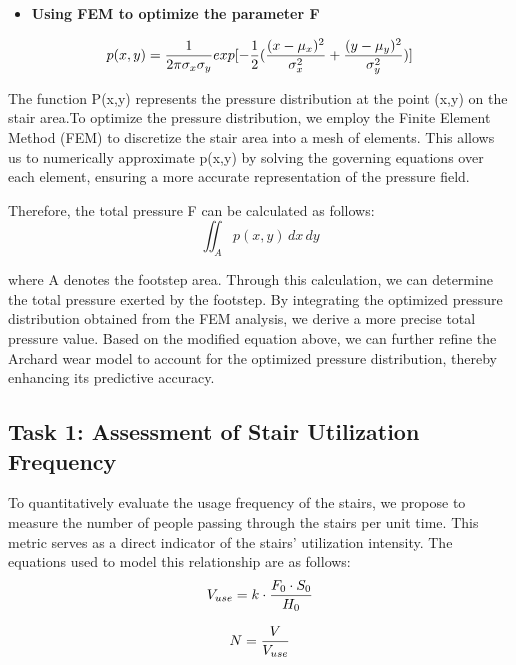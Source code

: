 \documentclass{mcmthesis}
\begin{document}
\begin{itemize}
\item {\bf Using FEM to optimize the parameter F}
\end{itemize}

\begin{equation} 
\label{eq:4}
\hfill p(x,y) = \frac{1}{2\pi\sigma_x\sigma_y} exp[-\frac{1}{2}(\frac{(x-\mu_x)^2}{\sigma_x^2} + \frac{(y-\mu_y)^2}{\sigma_y^2})]
\end{equation}

\noindent \hspace{1.5em}The function P(x,y) represents the pressure distribution at the point (x,y) on the stair area.To optimize the pressure distribution, we employ the Finite Element Method (FEM) to discretize the stair area into a mesh of elements. This allows us to numerically approximate p(x,y) by solving the governing equations over each element, ensuring a more accurate representation of the pressure field.

Therefore, the total pressure F can be calculated as follows:
\begin{equation}
\label{eq5}
\iint_A p(x, y) \, dx \, dy
\end{equation}
    
where A denotes the footstep area. Through this calculation, we can determine the total pressure exerted by the footstep. By integrating the optimized pressure distribution obtained from the FEM analysis, we derive a more precise total pressure value. Based on the modified equation above, we can further refine the Archard wear model to account for the optimized pressure distribution, thereby enhancing its predictive accuracy.

\subsection{Task 1: Assessment of Stair Utilization Frequency}

\hspace{1.5em}To quantitatively evaluate the usage frequency of the stairs, we propose to measure the number of people passing through the stairs per unit time. This metric serves as a direct indicator of the stairs' utilization intensity. The equations used to model this relationship are as follows:
\begin{equation}
\label{eq6}
\hfill V_{use} = k \cdot \frac{F_0\cdot S_0}{H_0}
\end{equation}

\begin{equation}
\label{eq7}
\hfill N = \frac{V}{V_{use}}
\end{equation}
\end{document}
